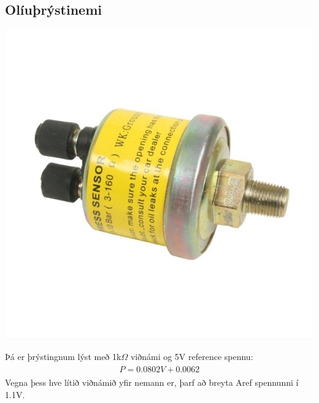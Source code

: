 \documentclass[paper=a4, fontsize=11pt]{scrartcl}
\numberwithin{equation}{section}		%
\numberwithin{figure}{section}			%
\numberwithin{table}{section}				%
\begin{document}
\subsection{Olíuþrýstinemi}
\begin{center}
\includegraphics[scale = 0.5]{oilp.jpg} \\
\end{center}
Þá er þrýstingnum lýst með 1k$\Omega$ \space  viðnámi og 5V reference spennu:  
\begin{align} 
	\begin{split}
	P = 0.0802 V + 0.0062
	\end{split}					
\end{align}
Vegna þess hve lítið viðnámið yfir nemann er, þarf að breyta Aref spennunni í 1.1V. 
\end{document}
